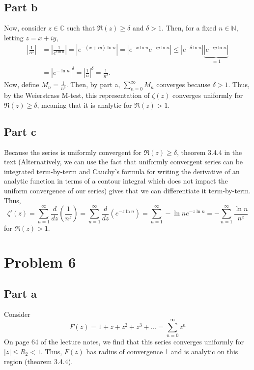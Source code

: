 \documentclass{article}
\begin{document}
\subsection{Part b}
Now, consider $z\in\mathbb{C}$ such that $\Re(z)\geq\delta$ and $\delta>1$. Then, for a fixed $n\in\mathbb{N}$, letting $z=x+iy$,
\begin{align*}
\left|\frac{1}{n^z}\right|&=\left|\frac{1}{e^{z\ln{n}}}\right|=\left|e^{-(x+iy)\ln{n}}\right|=\left|e^{-x\ln{n}}e^{-iy\ln{n}}\right|\leq\left|e^{-\delta\ln{n}}\right|\underbrace{\left|e^{-iy\ln{n}}\right|}_{=1}\\&=
\left|e^{-\ln{n}}\right|^\delta=\left|\frac{1}{n}\right|^\delta=\frac{1}{n^\delta}.
\end{align*}
Now, define $M_n=\frac{1}{n^\delta}$. Then, by part a, $\sum_{n=0}^{\infty}M_n$ converges because $\delta>1$. Thus, by the Weierstrass M-test, this representation of $\zeta(z)$ converges uniformly for $\Re(z)\geq\delta$, meaning that it is analytic for $\Re(z)>1$.
\subsection{Part c}
Because the series is uniformly convergent for $\Re(z)\geq\delta$, theorem 3.4.4 in the text (Alternatively, we can use the fact that uniformly convergent series can be integrated term-by-term and Cauchy's formula for writing the derivative of an analytic function in terms of a contour integral which does not impact the uniform convergence of our series) gives that we can differentiate it term-by-term. Thus,
\[
\zeta'(z)=\sum_{n=1}^\infty \frac{d}{dz}\left(\frac{1}{n^z}\right)=\sum_{n=1}^\infty \frac{d}{dz}\left(e^{-z\ln{n}}\right)=\sum_{n=1}^\infty -\ln{n}e^{-z\ln{n}}=-\sum_{n=1}^\infty\frac{\ln{n}}{n^z}
\]
for $\Re(z)>1$. 

\section{Problem 6}
\subsection{Part a}
Consider 
\[
			      F(z)=1+z+z^2+z^3+\ldots=\sum_{n=0}^\infty z^n
\]
On page 64 of the lecture notes, we find that this series converges uniformly for $|z|\leq R_2<1$. Thus, $F(z)$ has radius of convergence 1 and is analytic on this region (theorem 3.4.4).
\end{document}
